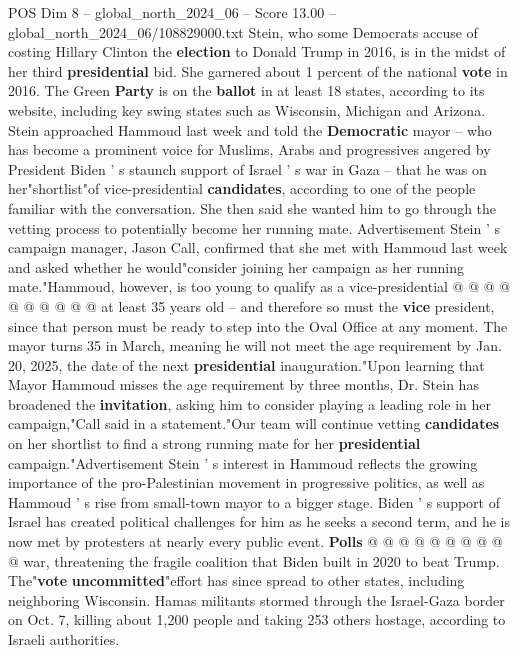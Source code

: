 \begin{textsample}{POS Dim 8 – global\_north\_2024\_06 – Score 13.00 – global\_north\_2024\_06/108829000.txt}  \label{ex:f8_pos_062}
Stein, who some Democrats accuse of costing Hillary Clinton the \textbf{election} to Donald Trump in 2016, is in the midst of her third \textbf{presidential} bid.
She garnered about 1 percent of the national \textbf{vote} in 2016.
The Green \textbf{Party} is on the \textbf{ballot} in at least 18 states, according to its website, including key swing states such as Wisconsin, Michigan and Arizona.
Stein approached Hammoud last week and told the \textbf{Democratic} mayor -- who has become a prominent voice for Muslims, Arabs and progressives angered by President Biden ' s staunch support of Israel ' s war in Gaza -- that he was on her"shortlist"of vice-presidential \textbf{candidates}, according to one of the people familiar with the conversation.
She then said she wanted him to go through the vetting process to potentially become her running mate.
Advertisement Stein ' s campaign manager, Jason Call, confirmed that she met with Hammoud last week and asked whether he would"consider joining her campaign as her running mate."Hammoud, however, is too young to qualify as a vice-presidential @ @ @ @ @ @ @ @ @ @ at least 35 years old -- and therefore so must the \textbf{vice} president, since that person must be ready to step into the Oval Office at any moment.
The mayor turns 35 in March, meaning he will not meet the age requirement by Jan. 20, 2025, the date of the next \textbf{presidential} inauguration."Upon learning that Mayor Hammoud misses the age requirement by three months, Dr.
Stein has broadened the \textbf{invitation}, asking him to consider playing a leading role in her campaign,"Call said in a statement."Our team will continue vetting \textbf{candidates} on her shortlist to find a strong running mate for her \textbf{presidential} campaign."Advertisement Stein ' s interest in Hammoud reflects the growing importance of the pro-Palestinian movement in progressive politics, as well as Hammoud ' s rise from small-town mayor to a bigger stage.
Biden ' s support of Israel has created political challenges for him as he seeks a second term, and he is now met by protesters at nearly every public event. \textbf{Polls} @ @ @ @ @ @ @ @ @ @ war, threatening the fragile coalition that Biden built in 2020 to beat Trump.
The"\textbf{vote} \textbf{uncommitted}"effort has since spread to other states, including neighboring Wisconsin.
Hamas militants stormed through the Israel-Gaza border on Oct. 7, killing about 1,200 people and taking 253 others hostage, according to Israeli authorities.

\end{textsample}
